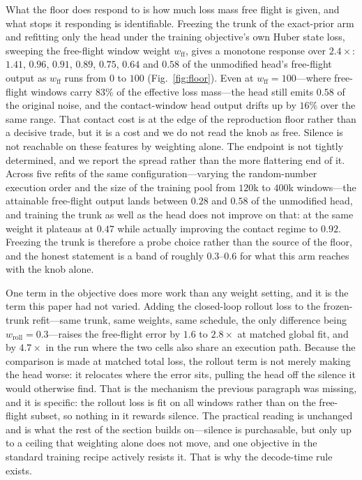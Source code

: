 \documentclass{article}
\begin{document}
What the floor does respond to is how much loss mass free flight is given, and what
stops it responding is identifiable. Freezing the trunk of the exact-prior arm and
refitting only the head under the training objective's own Huber state loss, sweeping
the free-flight window weight $w_{\text{ff}}$, gives a monotone response over
$2.4\times$: $1.41$, $0.96$, $0.91$, $0.89$, $0.75$, $0.64$ and $0.58$ of the
unmodified head's free-flight output as $w_{\text{ff}}$ runs from $0$ to $100$
(Fig.~\ref{fig:floor}). Even at $w_{\text{ff}}{=}100$---where free-flight windows
carry $83\%$ of the effective loss mass---the head still emits $0.58$ of the original
noise, and the contact-window head output drifts up by $16\%$ over the same range. That
contact cost is at the edge of the reproduction floor rather than a decisive trade, but
it is a cost and we do not read the knob as free. Silence is not
reachable on these features by weighting alone. The endpoint is not tightly
determined, and we report the spread rather than the more flattering end of it. Across
five refits of the same configuration---varying the random-number execution order and
the size of the training pool from $120$k to $400$k windows---the attainable
free-flight output lands between $0.28$ and $0.58$ of the unmodified head, and training
the trunk as well as the head does not improve on that: at the same weight it plateaus
at $0.47$ while actually improving the contact regime to $0.92$. Freezing the trunk is
therefore a probe choice rather than the source of the floor, and the honest statement
is a band of roughly $0.3$--$0.6$ for what this arm reaches with the knob alone.

One term in the objective does more work than any weight setting, and it is the term
this paper had not varied. Adding the closed-loop rollout loss to the frozen-trunk
refit---same trunk, same weights, same schedule, the only difference being
$w_{\text{roll}}{=}0.3$---raises the free-flight error by $1.6$ to $2.8\times$ at
matched global fit, and by $4.7\times$ in the run where the two cells also share an
execution path. Because the comparison is made at matched total loss, the rollout term
is not merely making the head worse: it relocates where the error sits, pulling the
head off the silence it would otherwise find. That is the mechanism the previous
paragraph was missing, and it is specific: the rollout loss is fit on all windows
rather than on the free-flight subset, so nothing in it rewards silence. The practical
reading is unchanged and is what the rest of the section builds on---silence is
purchasable, but only up to a ceiling that weighting alone does not move, and one
objective in the standard training recipe actively resists it. That is why the
decode-time rule exists.
\end{document}
